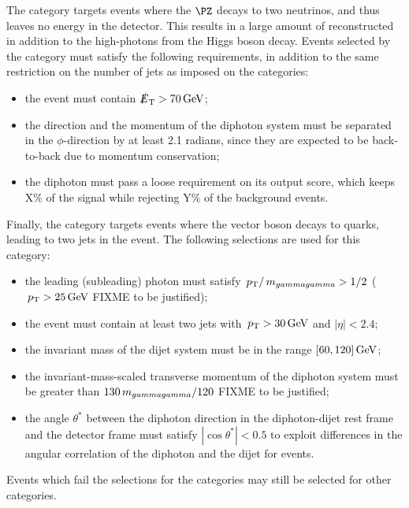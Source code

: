 The \VHMETTag category targets events where the $\PZ$ decays to two neutrinos, and thus leaves no energy in the detector. This results in a large amount of reconstructed \MET in addition to the high-\pT photons from the Higgs boson decay. Events selected by the \VHMETTag category must satisfy the following requirements, in addition to the same restriction on the number of jets as imposed on the \VHLeptonicTag categories:
\begin{itemize}
\item the event must contain $\slashed{E}_{\mathrm{T}} > 70\,\text{Ge\hspace{-.08em}V}$;
\item the \MET direction and the momentum of the diphoton system must be separated in the $\phi$-direction by at least 2.1 radians, since they are expected to be back-to-back due to momentum conservation;
\item the diphoton must pass a loose requirement on its \DiPhoBdt output score, which keeps X\% of the signal while rejecting Y\% of the background events.
\end{itemize}

Finally, the \VHHadronicTag category targets events where the vector boson decays to quarks, leading to two jets in the event. 
The following selections are used for this category:
\begin{itemize}
\item the leading (subleading) photon must satisfy $\,p_\text{T}/\,m_{gammagamma} > 1/2$ ($\,p_\text{T} > 25\,\text{Ge\hspace{-.08em}V}$ FIXME to be justified);
\item the event must contain at least two jets with $\,p_\text{T}>30\,\text{Ge\hspace{-.08em}V}$ and $|\eta|<2.4$;
\item the invariant mass of the dijet system must be in the range $[60,120]\,\text{Ge\hspace{-.08em}V}$;
\item the invariant-mass-scaled transverse momentum of the diphoton system must be greater than $130\,m_{gammagamma}/120$ FIXME to be justified; 
\item the angle $\theta^{*}$ between the diphoton direction in the diphoton-dijet rest frame and the detector frame must satisfy $|\cos{\theta^{*}}| <0.5$ to exploit differences in the angular correlation of the diphoton and the dijet for \VH events.
\end{itemize}

Events which fail the selections for the \VHTag categories may still be selected for other categories.


